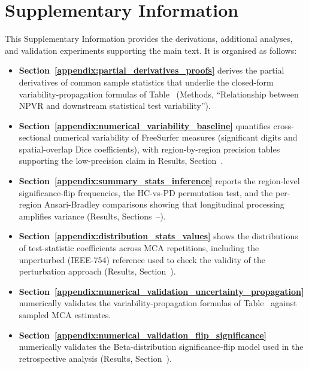 \clearpage

\appendix

\renewcommand{\thesection}{S\arabic{section}}
\renewcommand{\thefigure}{S\arabic{figure}}
\renewcommand{\thetable}{S\arabic{table}}
\renewcommand{\theequation}{S\arabic{equation}}
\setcounter{figure}{0}
\setcounter{table}{0}
\setcounter{equation}{0}

\section*{Supplementary Information}

This Supplementary Information provides the derivations, additional analyses, and
validation experiments supporting the main text. It is organised as follows:

\begin{itemize}
    \item \textbf{Section~\ref{appendix:partial_derivatives_proofs}} derives the
          partial derivatives of common sample statistics that underlie the
          closed-form variability-propagation formulas of Table~
          (Methods, ``Relationship between NPVR and downstream statistical test
          variability'').
    \item \textbf{Section~\ref{appendix:numerical_variability_baseline}} quantifies
          cross-sectional numerical variability of FreeSurfer measures (significant
          digits and spatial-overlap Dice coefficients), with region-by-region
          precision tables supporting the low-precision claim in Results, Section~.
    \item \textbf{Section~\ref{appendix:summary_stats_inference}} reports the
          region-level significance-flip frequencies, the HC-vs-PD permutation test,
          and the per-region Ansari-Bradley comparisons showing that longitudinal
          processing amplifies variance (Results, Sections~--).
    \item \textbf{Section~\ref{appendix:distribution_stats_values}} shows the
          distributions of test-statistic coefficients across MCA repetitions,
          including the unperturbed (IEEE-754) reference used to check the validity
          of the perturbation approach (Results, Section~).
    \item \textbf{Section~\ref{appendix:numerical_validation_uncertainty_propagation}}
          numerically validates the variability-propagation formulas of
          Table~ against sampled MCA estimates.
    \item \textbf{Section~\ref{appendix:numerical_validation_flip_significance}}
          numerically validates the Beta-distribution significance-flip model used
          in the retrospective analysis (Results, Section~).
\end{itemize}

